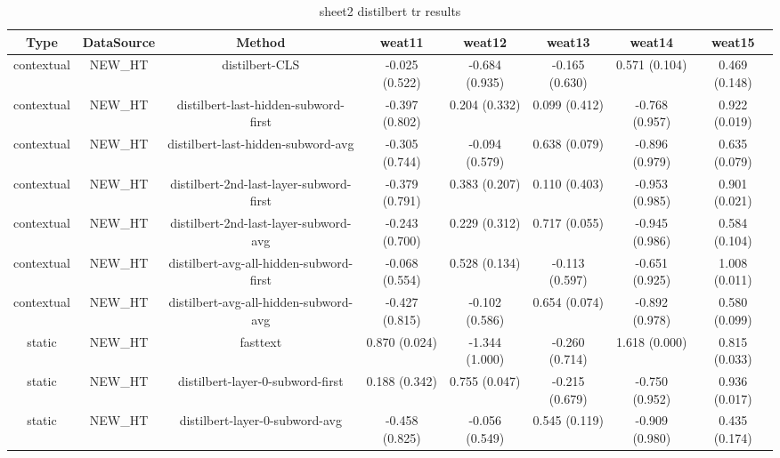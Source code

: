 \begin{sidewaystable}[htb]
    \centering
    \caption{sheet2 distilbert tr results}
    \label{appendix_tab:sheet2_distilbert_tr_results}
    \small
    \begin{tabular}{@{}cccccccc@{}}
        \toprule
        Type & DataSource & Method & weat11 & weat12 & weat13 & weat14 & weat15 \\
        \midrule
        contextual & NEW\_HT & distilbert-CLS & -0.025 (0.522) & -0.684 (0.935) & -0.165 (0.630) & 0.571 (0.104) & 0.469 (0.148) \\
        contextual & NEW\_HT & distilbert-last-hidden-subword-first & -0.397 (0.802) & 0.204 (0.332) & 0.099 (0.412) & -0.768 (0.957) & 0.922 (0.019) \\
        contextual & NEW\_HT & distilbert-last-hidden-subword-avg & -0.305 (0.744) & -0.094 (0.579) & 0.638 (0.079) & -0.896 (0.979) & 0.635 (0.079) \\
        contextual & NEW\_HT & distilbert-2nd-last-layer-subword-first & -0.379 (0.791) & 0.383 (0.207) & 0.110 (0.403) & -0.953 (0.985) & 0.901 (0.021) \\
        contextual & NEW\_HT & distilbert-2nd-last-layer-subword-avg & -0.243 (0.700) & 0.229 (0.312) & 0.717 (0.055) & -0.945 (0.986) & 0.584 (0.104) \\
        contextual & NEW\_HT & distilbert-avg-all-hidden-subword-first & -0.068 (0.554) & 0.528 (0.134) & -0.113 (0.597) & -0.651 (0.925) & 1.008 (0.011) \\
        contextual & NEW\_HT & distilbert-avg-all-hidden-subword-avg & -0.427 (0.815) & -0.102 (0.586) & 0.654 (0.074) & -0.892 (0.978) & 0.580 (0.099) \\
        static & NEW\_HT & fasttext & 0.870 (0.024) & -1.344 (1.000) & -0.260 (0.714) & 1.618 (0.000) & 0.815 (0.033) \\
        static & NEW\_HT & distilbert-layer-0-subword-first & 0.188 (0.342) & 0.755 (0.047) & -0.215 (0.679) & -0.750 (0.952) & 0.936 (0.017) \\
        static & NEW\_HT & distilbert-layer-0-subword-avg & -0.458 (0.825) & -0.056 (0.549) & 0.545 (0.119) & -0.909 (0.980) & 0.435 (0.174) \\
        \bottomrule
    \end{tabular}
\end{sidewaystable}